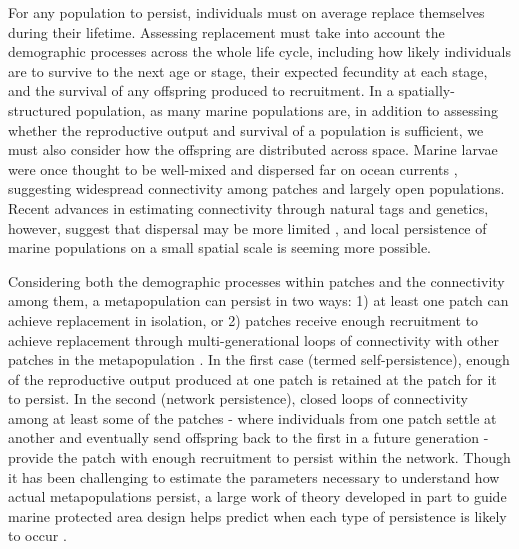 \documentclass[12pt, oneside]{article}   	%
\begin{document}
For any population to persist, individuals must on average replace themselves during their lifetime. Assessing replacement must take into account the demographic processes across the whole life cycle, including how likely individuals are to survive to the next age or stage, their expected fecundity at each stage, and the survival of any offspring produced to recruitment. In a spatially-structured population, as many marine populations are, in addition to assessing whether the reproductive output and survival of a population is sufficient, we must also consider how the offspring are distributed across space. Marine larvae were once thought to be well-mixed and dispersed far on ocean currents \citep[e.g.][]{roughgarden_recruitment_1988}, suggesting widespread connectivity among patches and largely open populations. Recent advances in estimating connectivity through natural tags and genetics, however, suggest that dispersal may be more limited \citep[e.g.][]{daloia_self-recruitment_2013, hameed2016inverse, almany2017larval}, and local persistence of marine populations on a small spatial scale is seeming more possible.  %

Considering both the demographic processes within patches and the connectivity among them, a metapopulation can persist in two ways: 1) at least one patch can achieve replacement in isolation, or 2) patches receive enough recruitment to achieve replacement through multi-generational loops of connectivity with other patches in the metapopulation \citep{hastings_persistence_2006, burgess2014beyond}. In the first case (termed self-persistence), enough of the reproductive output produced at one patch is retained at the patch for it to persist. In the second (network persistence), closed loops of connectivity among at least some of the patches - where individuals from one patch settle at another and eventually send offspring back to the first in a future generation - provide the patch with enough recruitment to persist within the network. Though it has been challenging to estimate the parameters necessary to understand how actual metapopulations persist, a large work of theory developed in part to guide marine protected area design helps predict when each type of persistence is likely to occur \citep[i.e., large patches relative to the mean dispersal distance are likely to be self-persistent,][]{botsford_dependence_2001}. %
\end{document}
